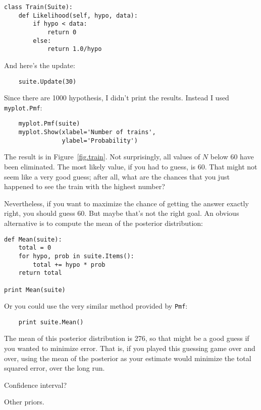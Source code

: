 \documentclass[12pt]{book}
\begin{document}
\begin{verbatim}
class Train(Suite):
    def Likelihood(self, hypo, data):
        if hypo < data:
            return 0
        else:
            return 1.0/hypo
\end{verbatim}

And here's the update:

\begin{verbatim}
    suite.Update(30)
\end{verbatim}

Since there are 1000 hypothesis, I didn't print the results.
Instead I used {\tt myplot.Pmf}:

\begin{verbatim}
    myplot.Pmf(suite)
    myplot.Show(xlabel='Number of trains',
                ylabel='Probability')
\end{verbatim}

The result is in Figure~\ref{fig.train}.  Not surprisingly, all
values of $N$ below 60 have been eliminated.  The most likely
value, if you had to guess, is 60.  That might not seem like
a very good guess; after all, what are the chances that you just
happened to see the train with the highest number?

Nevertheless, if you want to maximize the chance of getting
the answer exactly right, you should guess 60.  But maybe that's
not the right goal.  An obvious alternative is to compute the
mean of the posterior distribution:

\begin{verbatim}
def Mean(suite):
    total = 0
    for hypo, prob in suite.Items():
        total += hypo * prob
    return total

print Mean(suite)
\end{verbatim}

Or you could use the very similar method provided by {\tt Pmf}:

\begin{verbatim}
    print suite.Mean()
\end{verbatim}

The mean of this posterior distribution is 276, so that might
be a good guess if you wanted to minimize error.  That is,
if you played this guessing game over and over, using the mean
of the posterior as your estimate would minimize
the total squared error, over the long run.

Confidence interval?

Other priors.


\begin{verbatim}
\end{verbatim}

\begin{verbatim}
\end{verbatim}

\begin{verbatim}
\end{verbatim}

\begin{verbatim}
\end{verbatim}

\begin{verbatim}
\end{verbatim}

\begin{verbatim}
\end{verbatim}

\begin{verbatim}
\end{verbatim}
\end{document}

